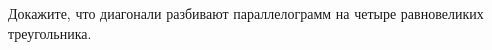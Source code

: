 \begin{ex}
	\begin{condition}
		Докажите, что диагонали разбивают параллелограмм на четыре равновеликих треугольника.
	\end{condition}
\end{ex}